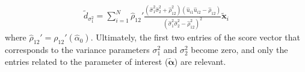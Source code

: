 \documentclass[aap,authoryear, preprint]{imsart}
\numberwithin{equation}{section}
\theoremstyle{plain}
\begin{document}
\begin{align*}
    \tilde{d}_{\sigma_1^2} = \sum_{i=1}^{N} \hat{\rho}_{12}' \frac{(\hat{\sigma}_1^2\hat{\sigma}_2^2 + \hat{\rho}_{12}^2)(\hat{u}_{i1}\hat{u}_{i2} - \hat{\rho}_{12})}{(\hat{\sigma}_1^2\hat{\sigma}_2^2 - \hat{\rho}_{12}^2)^2}\bm{\tilde{x}}_i
\end{align*}
where $\hat{\rho}_{12}' = \rho_{12}'(\hat{\alpha}_0)$. Ultimately, the first two entries of the score vector that corresponds to the variance parameters $\sigma_1^2$ and $\sigma_2^2$ become zero, and only the entries related to the parameter of interest ($\bm{\tilde{\alpha}}$) are relevant. 
\end{document}

